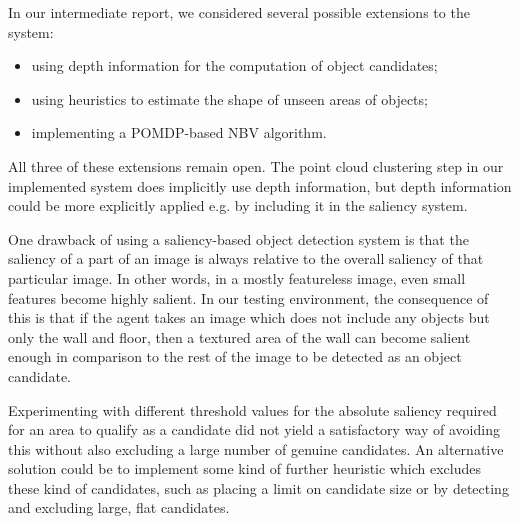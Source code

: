 In our intermediate report, we considered several possible extensions to the system:
\begin{itemize}
	\setlength\itemsep{1pt}
	\item using depth information for the computation of object candidates;
	\item using heuristics to estimate the shape of unseen areas of objects;
	\item implementing a POMDP-based NBV algorithm.
\end{itemize}

All three of these extensions remain open.
The point cloud clustering step in our implemented system does implicitly use depth information, but depth information could be more explicitly applied e.g. by including it in the saliency system.

One drawback of using a saliency-based object detection system is that the saliency of a part of an image is always relative to the overall saliency of that particular image.
In other words, in a mostly featureless image, even small features become highly salient.
In our testing environment, the consequence of this is that if the agent takes an image which does not include any objects but only the wall and floor, then a textured area of the wall can become salient enough in comparison to the rest of the image to be detected as an object candidate.

Experimenting with different threshold values for the absolute saliency required for an area to qualify as a candidate did not yield a satisfactory way of avoiding this without also excluding a large number of genuine candidates.
An alternative solution could be to implement some kind of further heuristic which excludes these kind of candidates, such as placing a limit on candidate size or by detecting and excluding large, flat candidates.

